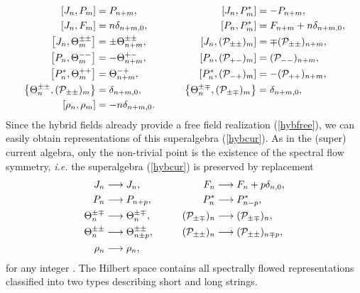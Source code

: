 \documentclass[a4paper,seceq,preprint]{ptptex}
\begin{document}
\begin{alignat}{2}
  \left[J_n,P_m\right]&=P_{n+m},&\qquad
  \left[J_n,P^*_m\right]&=-P_{n+m},\nonumber\\
  \left[J_n,F_m\right]&=n\delta_{n+m,0},&\qquad 
  \left[P_n,P^*_m\right]&=F_{n+m}+n\delta_{n+m,0},\nonumber\\
  \left[J_n,\Theta^{\pm\pm}_m\right]&=\pm\Theta^{\pm\pm}_{n+m},&\qquad
  \left[J_n,({\cal P}_{\pm\pm})_m\right]&=\mp({\cal
  P}_{\pm\pm})_{n+m},\nonumber\\
  \left[P_n,\Theta^{--}_m\right]&=-\Theta^{+-}_{n+m},&\qquad 
  \left[P_n,({\cal P}_{+-})_m\right]&=({\cal P}_{--})_{n+m},\nonumber\\
  \left[P^*_n,\Theta^{++}_m\right]&=\Theta^{-+}_{n+m},&\qquad
  \left[P^*_n,({\cal P}_{-+})_m\right]&=-({\cal P}_{++})_{n+m},\nonumber\\
  \left\{\Theta^{\pm\pm}_n,({\cal P}_{\pm\pm})_m\right\}&=\delta_{n+m,0},
&\qquad
  \left\{\Theta^{\pm\mp}_n,({\cal P}_{\pm\mp})_m\right\}&=\delta_{n+m,0},
\nonumber\\
\left[\rho_n,\rho_m\right]&=-n\delta_{n+m,0}.&&\label{hybcur}
\end{alignat}
Since the hybrid fields already provide a free field 
realization (\ref{hybfree}), we can easily obtain 
representations of this superalgebra (\ref{hybcur}).
As in the \coordHE{} (super) current algebra,\cite{KK,KP}\cite{HS2}
only the non-trivial point is the existence of the spectral flow
symmetry, {\it i.e.} the superalgebra (\ref{hybcur}) is 
preserved by replacement
\begin{alignat}{2}
  J_n&\longrightarrow J_n,&\qquad
  F_n&\longrightarrow F_n+p\delta_{n,0},\nonumber\\
  P_n&\longrightarrow P_{n+p},&\qquad
  P^*_n&\longrightarrow P^*_{n-p},\nonumber\\
  \Theta^{\pm\mp}_n&\longrightarrow\Theta^{\pm\mp}_n,&\qquad
  ({\cal P}_{\pm\mp})_n&\longrightarrow ({\cal P}_{\pm\mp})_n,\nonumber\\
  \Theta^{\pm\pm}_n&\longrightarrow\Theta^{\pm\pm}_{n\pm p},&\qquad
  ({\cal P}_{\pm\pm})_n&\longrightarrow ({\cal P}_{\pm\pm})_{n\mp p},
\nonumber\\
 \rho_n&\longrightarrow\rho_n,& &
\label{spcf}
\end{alignat}
for any integer \coordHE{}.
The Hilbert space contains all spectrally flowed representations 
classified into two types describing short and long strings.\cite{KP}
\end{document}
